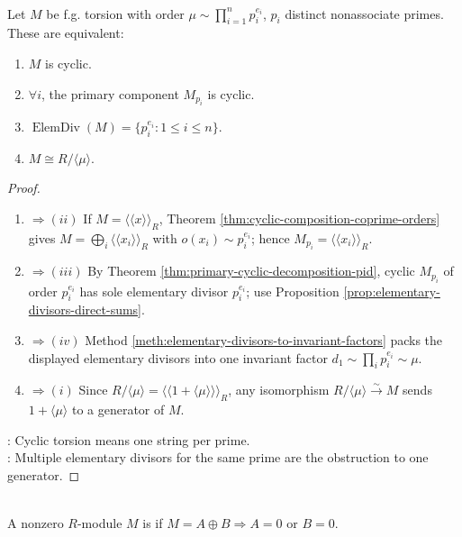 \begin{theorem} \label{thm:cyclic-torsion-module-characterization} \\
Let $M$ be f.g. torsion with order $\mu\sim\prod_{i=1}^np_i^{e_i}$, $p_i$ distinct nonassociate primes. These are equivalent:
\begin{enumerate}[label=(\roman*)]
\setlength{\itemsep}{0pt}
\item $M$ is cyclic.
\item $\forall i$, the primary component $M_{p_i}$ is cyclic.
\item $\operatorname{ElemDiv}(M)=\{p_i^{e_i}:1\leq i\leq n\}$.
\item $M\cong R/\langle\mu\rangle$.
\end{enumerate}
\begin{proof}
\begin{enumerate}[label=(\roman*).]
\setlength{\itemsep}{0pt}
\item[$(i)$]$\Rightarrow (ii)$ If $M=\langle\!\langle x\rangle\!\rangle_R$, Theorem \ref{thm:cyclic-composition-coprime-orders} gives $M=\bigoplus_i\langle\!\langle x_i\rangle\!\rangle_R$ with $o(x_i)\sim p_i^{e_i}$; hence $M_{p_i}=\langle\!\langle x_i\rangle\!\rangle_R$.
\item[$(ii)$]$\Rightarrow (iii)$ By Theorem
\ref{thm:primary-cyclic-decomposition-pid}, cyclic $M_{p_i}$ of order $p_i^{e_i}$ has sole elementary divisor $p_i^{e_i}$; use Proposition \ref{prop:elementary-divisors-direct-sums}.
\item[$(iii)$]$\Rightarrow (iv)$ Method \ref{meth:elementary-divisors-to-invariant-factors} packs the displayed elementary divisors into one invariant factor $d_1\sim\prod_ip_i^{e_i}\sim\mu$.
\item[$(iv)$]$\Rightarrow (i)$ Since
$R/\langle\mu\rangle=\langle\!\langle 1+\langle\mu\rangle\rangle\!\rangle_R$,
any isomorphism $R/\langle\mu\rangle\xrightarrow{\sim}M$ sends
$1+\langle\mu\rangle$ to a generator of $M$.
\end{enumerate}
: Cyclic torsion means one string per prime.\\
: Multiple elementary divisors for the same prime are the obstruction to one generator.
\end{proof}
\end{theorem}

\begin{definition} \label{def:indecomposable-module} \\
A nonzero $R$-module $M$ is  if $M=A\oplus B\Longrightarrow A=0$ or $B=0$.
\end{definition}

